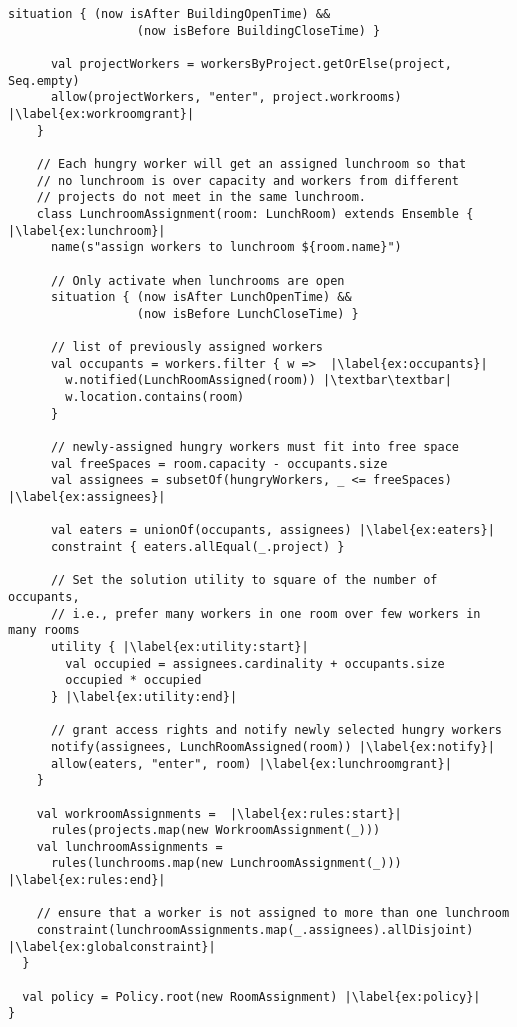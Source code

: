 \begin{lstlisting}[style=ensembles]
      situation { (now isAfter BuildingOpenTime) &&
                  (now isBefore BuildingCloseTime) }

      val projectWorkers = workersByProject.getOrElse(project, Seq.empty)
      allow(projectWorkers, "enter", project.workrooms) |\label{ex:workroomgrant}|
    }

    // Each hungry worker will get an assigned lunchroom so that
    // no lunchroom is over capacity and workers from different
    // projects do not meet in the same lunchroom.
    class LunchroomAssignment(room: LunchRoom) extends Ensemble { |\label{ex:lunchroom}|
      name(s"assign workers to lunchroom ${room.name}")

      // Only activate when lunchrooms are open
      situation { (now isAfter LunchOpenTime) &&
                  (now isBefore LunchCloseTime) }

      // list of previously assigned workers
      val occupants = workers.filter { w =>  |\label{ex:occupants}|
        w.notified(LunchRoomAssigned(room)) |\textbar\textbar|
        w.location.contains(room)
      }

      // newly-assigned hungry workers must fit into free space
      val freeSpaces = room.capacity - occupants.size
      val assignees = subsetOf(hungryWorkers, _ <= freeSpaces) |\label{ex:assignees}|

      val eaters = unionOf(occupants, assignees) |\label{ex:eaters}|
      constraint { eaters.allEqual(_.project) }

      // Set the solution utility to square of the number of occupants,
      // i.e., prefer many workers in one room over few workers in many rooms
      utility { |\label{ex:utility:start}|
        val occupied = assignees.cardinality + occupants.size
        occupied * occupied
      } |\label{ex:utility:end}|

      // grant access rights and notify newly selected hungry workers
      notify(assignees, LunchRoomAssigned(room)) |\label{ex:notify}|
      allow(eaters, "enter", room) |\label{ex:lunchroomgrant}|
    }

    val workroomAssignments =  |\label{ex:rules:start}|
      rules(projects.map(new WorkroomAssignment(_)))
    val lunchroomAssignments =
      rules(lunchrooms.map(new LunchroomAssignment(_))) |\label{ex:rules:end}|

    // ensure that a worker is not assigned to more than one lunchroom
    constraint(lunchroomAssignments.map(_.assignees).allDisjoint) |\label{ex:globalconstraint}|
  }

  val policy = Policy.root(new RoomAssignment) |\label{ex:policy}|
}
\end{lstlisting}
\pagebreak
